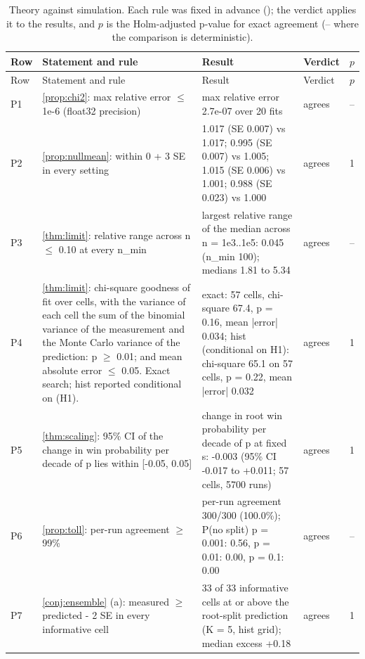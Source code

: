 \begin{longtable}{@{}l p{} p{} l l@{}}
\caption{Theory against simulation. Each rule was fixed in advance (); the verdict applies it to the results, and $p$ is the Holm-adjusted p-value for exact agreement (-- where the comparison is deterministic).}\label{tab:agreement}\\
\toprule
Row & Statement and rule & Result & Verdict & $p$ \\
\midrule\endfirsthead
\toprule Row & Statement and rule & Result & Verdict & $p$ \\ \midrule\endhead
P1 & \raggedright \cref{prop:chi2}: max relative error $\le$ 1e-6 (float32 precision) & \raggedright max relative error 2.7e-07 over 20 fits & agrees & -- \\
\addlinespace
P2 & \raggedright \cref{prop:nullmean}: within 0 + 3 SE in every setting & \raggedright 1.017 (SE 0.007) vs 1.017; 0.995 (SE 0.007) vs 1.005; 1.015 (SE 0.006) vs 1.001; 0.988 (SE 0.023) vs 1.000 & agrees & 1 \\
\addlinespace
P3 & \raggedright \cref{thm:limit}: relative range across n $\le$ 0.10 at every n\_min & \raggedright largest relative range of the median across n = 1e3..1e5: 0.045 (n\_min 100); medians 1.81 to 5.34 & agrees & -- \\
\addlinespace
P4 & \raggedright \cref{thm:limit}: chi-square goodness of fit over cells, with the variance of each cell the sum of the binomial variance of the measurement and the Monte Carlo variance of the prediction: p $\ge$ 0.01; and mean absolute error $\le$ 0.05. Exact search; hist reported conditional on (H1). & \raggedright exact: 57 cells, chi-square 67.4, p = 0.16, mean |error| 0.034; hist (conditional on H1): chi-square 65.1 on 57 cells, p = 0.22, mean |error| 0.032 & agrees & 1 \\
\addlinespace
P5 & \raggedright \cref{thm:scaling}: 95\% CI of the change in win probability per decade of p lies within [-0.05, 0.05] & \raggedright change in root win probability per decade of p at fixed s: -0.003 (95\% CI -0.017 to +0.011; 57 cells, 5700 runs) & agrees & 1 \\
\addlinespace
P6 & \raggedright \cref{prop:toll}: per-run agreement $\ge$ 99\% & \raggedright per-run agreement 300/300 (100.0\%); P(no split) p = 0.001: 0.56, p = 0.01: 0.00, p = 0.1: 0.00 & agrees & -- \\
\addlinespace
P7 & \raggedright \cref{conj:ensemble} (a): measured $\ge$ predicted - 2 SE in every informative cell & \raggedright 33 of 33 informative cells at or above the root-split prediction (K = 5, hist grid); median excess +0.18 & agrees & 1 \\

\end{longtable}
